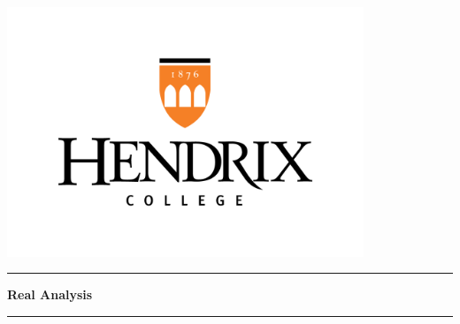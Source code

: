 \documentclass[12pt, oneside]{book}
\newcounter{BoxCounter}
\begin{document}



\newcommand{\titlestandin}[0]{Real Analysis}
\newcommand{\cussubtitle}[0]{MATH 350}
\newcommand{\startdate}[0]{August 26, 2024}
\newcommand{\customenddate}[0]{December 2, 2024}
\newcommand{\professor}[0]{Prof. Christopher Camfield, Ph.D.}




\begin{titlepage}
    \begin{center}

        \vspace*{-2cm}
        \includegraphics[width=0.8\textwidth]{images/Hendrix Logo.png}\\
        \vfill

        \textcolor{horange}{\rule{\textwidth}{1.0pt}}

        \vspace{2em}

        {\huge \textbf{\titlestandin}}

        \vspace{1em} %

        \textcolor{horange}{\rule{\textwidth}{1.0pt}}

        \vspace*{1\baselineskip}


\end{center}
\end{titlepage}
\end{document}
